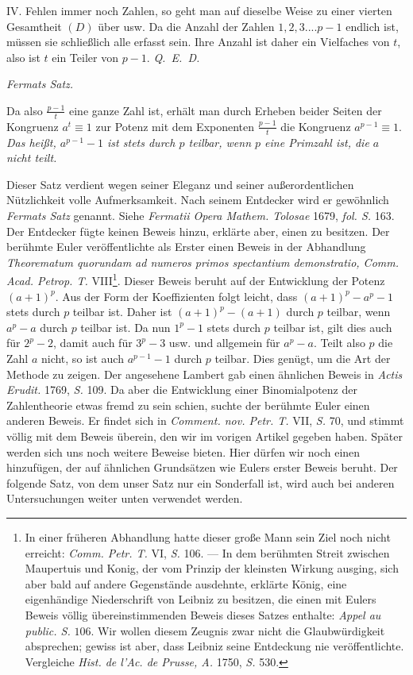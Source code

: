 IV. Fehlen immer noch Zahlen, so geht man auf dieselbe Weise zu einer vierten Gesamtheit $(D)$ über usw. Da die Anzahl der Zahlen $1,2,3....p-1$ endlich ist, müssen sie schließlich alle erfasst sein. Ihre Anzahl ist daher ein Vielfaches von $t$, also ist $t$ ein Teiler von $p-1$. \mbox{\emph{Q. E. D.}}

\begin{center}\small\emph{Fermats Satz.}\end{center}


Da also $\frac{p-1}{t}$ eine ganze Zahl ist, erhält man durch Erheben beider Seiten der Kongruenz $a^t\equiv1$ zur Potenz mit dem Exponenten $\frac{p-1}{t}$ die Kongruenz $a^{p-1}\equiv1$. \emph{Das heißt, $a^{p-1}-1$ ist stets durch $p$ teilbar, wenn $p$ eine Primzahl ist, die $a$ nicht teilt.}

Dieser Satz verdient wegen seiner Eleganz und seiner außerordentlichen Nützlichkeit volle Aufmerksamkeit. Nach seinem Entdecker wird er gewöhnlich \emph{Fermats Satz} genannt. Siehe \emph{Fermatii Opera Mathem. Tolosae} 1679, \emph{fol. S.} 163. Der Entdecker fügte keinen Beweis hinzu, erklärte aber, einen zu besitzen. Der berühmte Euler veröffentlichte als Erster einen Beweis in der Abhandlung \emph{Theorematum quorundam ad numeros primos spectantium demonstratio, Comm. Acad. Petrop. T.} VIII\begingroup\renewcommand{\thefootnote}{*)}\footnote{In einer früheren Abhandlung hatte dieser große Mann sein Ziel noch nicht erreicht: \emph{Comm. Petr. T.} VI, \emph{S.} 106. --- In dem berühmten Streit zwischen Maupertuis und Konig, der vom Prinzip der kleinsten Wirkung ausging, sich aber bald auf andere Gegenstände ausdehnte, erklärte K\"onig, eine eigenhändige Niederschrift von Leibniz zu besitzen, die einen mit Eulers Beweis völlig übereinstimmenden Beweis dieses Satzes enthalte: \emph{Appel au public. S.} $106$. Wir wollen diesem Zeugnis zwar nicht die Glaubwürdigkeit absprechen; gewiss ist aber, dass Leibniz seine Entdeckung nie veröffentlichte. Vergleiche \emph{Hist. de l'Ac. de Prusse, A.} 1750, \emph{S.} 530.}\endgroup. Dieser Beweis beruht auf der Entwicklung der Potenz $(a+1)^p$. Aus der Form der Koeffizienten folgt leicht, dass $(a+1)^p-a^p-1$ stets durch $p$ teilbar ist. Daher ist $(a+1)^p-(a+1)$ durch $p$ teilbar, wenn $a^p-a$ durch $p$ teilbar ist. Da nun $1^p-1$ stets durch $p$ teilbar ist, gilt dies auch für $2^p-2$, damit auch für $3^p-3$ usw. und allgemein für $a^p-a$. Teilt also $p$ die Zahl $a$ nicht, so ist auch $a^{p-1}-1$ durch $p$ teilbar. Dies genügt, um die Art der Methode zu zeigen. Der angesehene Lambert gab einen ähnlichen Beweis in \emph{Actis Erudit.} 1769,
\emph{S.} 109. Da aber die Entwicklung einer Binomialpotenz der Zahlentheorie etwas fremd zu sein schien, suchte der berühmte Euler einen anderen Beweis. Er findet sich in \emph{Comment. nov. Petr. T.} VII, \emph{S.} 70, und stimmt völlig mit dem Beweis überein, den wir im vorigen Artikel gegeben haben. Später werden sich uns noch weitere Beweise bieten. Hier dürfen wir noch einen hinzufügen, der auf ähnlichen Grundsätzen wie Eulers erster Beweis beruht. Der folgende Satz, von dem unser Satz nur ein Sonderfall ist, wird auch bei anderen Untersuchungen weiter unten verwendet werden.

